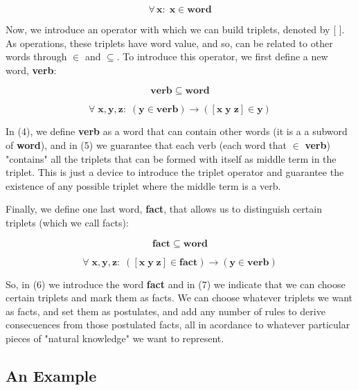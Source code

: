 \documentclass{IOS-Book-Article}     %
\begin{document}
\begin{equation}
\forall\,\mathbf{x:\;x\in word}
\end{equation}

Now, we introduce an operator with which we can build triplets, denoted by [ ].
As operations, these triplets have word value, and so, can be related to
other words through $\in$ and $\subseteq$. To introduce this operator,
we first define a new word, \textbf{verb}:

\begin{equation}
\mathbf{verb\subseteq word}
\end{equation}

\begin{equation}
\forall\;\mathbf{x\mathrm{,\mathbf{y\mathrm{,\mathbf{z}:\;\mathbf{\left(\mathbf{y\in\mathbf{verb}}\right)\rightarrow\left(\left[\mathbf{x\; y\; z}\right]\in y\right)}}}}}
\end{equation}

In (4), we define \textbf{verb} as a word that can contain other words
(it is a a subword of \textbf{word}), and in (5) we guarantee that each verb
(each word that $\in$ \textbf{verb}) "contains" all the triplets that can be
formed with itself as middle term in the triplet. This is just a device to
introduce the triplet operator and guarantee the existence of
any possible triplet where the middle term is a verb.

Finally, we define one last word, \textbf{fact}, that allows us to distinguish
certain triplets (which we call facts):

\begin{equation}
\mathbf{fact\subseteq word}
\end{equation}

\begin{equation}
\forall\;\mathbf{x\mathrm{,\mathbf{y\mathrm{,\mathbf{z}:\;\left(\left[\mathbf{x\; y\; z}\right]\in \mathbf{fact}\right)}\mathbf\rightarrow\left(\mathbf{y\in\mathbf{verb}}\right)}}}
\end{equation}

So, in (6) we introduce the word \textbf{fact}
and in (7) we indicate that we can choose certain triplets and mark
them as facts. We can choose whatever triplets we want as facts,
and set them as postulates, and add any number of rules
to derive consecuences from those postulated facts,
all in acordance to whatever particular pieces of "natural knowledge"
we want to represent.

\subsection{An Example}
\end{document}
